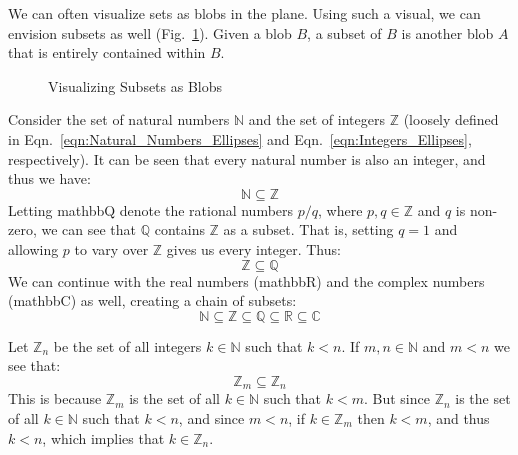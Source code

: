         We can often visualize sets as blobs in the plane. Using such a visual,
        we can envision subsets as well (Fig.~\ref{fig:Subset_Blobs}). Given a
        blob $B$, a subset of $B$ is another blob $A$ that is entirely contained
        within $B$.
        \begin{figure}[H]
            \centering
            
            \caption{Visualizing Subsets as Blobs}
            \label{fig:Subset_Blobs}
        \end{figure}
        \begin{example}
            Consider the set of natural numbers $\mathbb{N}$ and the set of
            integers $\mathbb{Z}$ (loosely defined in
            Eqn.~\ref{eqn:Natural_Numbers_Ellipses} and
            Eqn.~\ref{eqn:Integers_Ellipses}, respectively). It can be seen that
            every natural number is also an integer, and thus we have:
            \begin{equation}
                \mathbb{N}\subseteq\mathbb{Z}
            \end{equation}
            Letting \gls{mathbbQ} denote the rational
            numbers $p/q$, where $p,q\in\mathbb{Z}$ and
            $q$ is non-zero, we can see that $\mathbb{Q}$ contains $\mathbb{Z}$
            as a subset. That is, setting $q=1$ and allowing $p$ to vary over
            $\mathbb{Z}$ gives us every integer. Thus:
            \begin{equation}
                \mathbb{Z}\subseteq\mathbb{Q}
            \end{equation}
            We can continue with the real numbers (\gls{mathbbR}) and the
            complex numbers (\gls{mathbbC}) as well, creating a chain of
            subsets:
            \begin{equation}
                \mathbb{N}\subseteq\mathbb{Z}\subseteq\mathbb{Q}
                \subseteq\mathbb{R}\subseteq\mathbb{C}
            \end{equation}
        \end{example}
        \begin{example}
            Let $\mathbb{Z}_{n}$ be the set of all integers $k\in\mathbb{N}$
            such that $k<n$. If $m,n\in\mathbb{N}$ and $m<n$ we see that:
            \begin{equation}
                \mathbb{Z}_{m}\subseteq\mathbb{Z}_{n}
            \end{equation}
            This is because $\mathbb{Z}_{m}$ is the set of all $k\in\mathbb{N}$
            such that $k<m$. But since $\mathbb{Z}_{n}$ is the set of all
            $k\in\mathbb{N}$ such that $k<n$, and since $m<n$, if
            $k\in\mathbb{Z}_{m}$ then $k<m$, and thus $k<n$, which implies that
            $k\in\mathbb{Z}_{n}$.
        \end{example}
